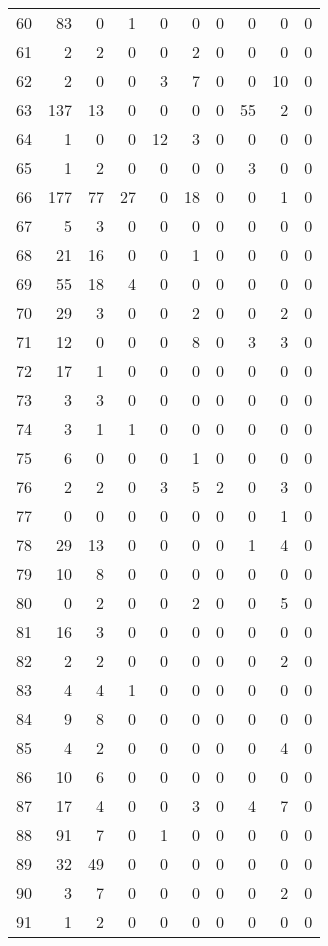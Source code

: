 \begin{tabular}{lrrrrrrrrr}
60 & 83 & 0 & 1 & 0 & 0 & 0 & 0 & 0 & 0 \\
61 & 2 & 2 & 0 & 0 & 2 & 0 & 0 & 0 & 0 \\
62 & 2 & 0 & 0 & 3 & 7 & 0 & 0 & 10 & 0 \\
63 & 137 & 13 & 0 & 0 & 0 & 0 & 55 & 2 & 0 \\
64 & 1 & 0 & 0 & 12 & 3 & 0 & 0 & 0 & 0 \\
65 & 1 & 2 & 0 & 0 & 0 & 0 & 3 & 0 & 0 \\
66 & 177 & 77 & 27 & 0 & 18 & 0 & 0 & 1 & 0 \\
67 & 5 & 3 & 0 & 0 & 0 & 0 & 0 & 0 & 0 \\
68 & 21 & 16 & 0 & 0 & 1 & 0 & 0 & 0 & 0 \\
69 & 55 & 18 & 4 & 0 & 0 & 0 & 0 & 0 & 0 \\
70 & 29 & 3 & 0 & 0 & 2 & 0 & 0 & 2 & 0 \\
71 & 12 & 0 & 0 & 0 & 8 & 0 & 3 & 3 & 0 \\
72 & 17 & 1 & 0 & 0 & 0 & 0 & 0 & 0 & 0 \\
73 & 3 & 3 & 0 & 0 & 0 & 0 & 0 & 0 & 0 \\
74 & 3 & 1 & 1 & 0 & 0 & 0 & 0 & 0 & 0 \\
75 & 6 & 0 & 0 & 0 & 1 & 0 & 0 & 0 & 0 \\
76 & 2 & 2 & 0 & 3 & 5 & 2 & 0 & 3 & 0 \\
77 & 0 & 0 & 0 & 0 & 0 & 0 & 0 & 1 & 0 \\
78 & 29 & 13 & 0 & 0 & 0 & 0 & 1 & 4 & 0 \\
79 & 10 & 8 & 0 & 0 & 0 & 0 & 0 & 0 & 0 \\
80 & 0 & 2 & 0 & 0 & 2 & 0 & 0 & 5 & 0 \\
81 & 16 & 3 & 0 & 0 & 0 & 0 & 0 & 0 & 0 \\
82 & 2 & 2 & 0 & 0 & 0 & 0 & 0 & 2 & 0 \\
83 & 4 & 4 & 1 & 0 & 0 & 0 & 0 & 0 & 0 \\
84 & 9 & 8 & 0 & 0 & 0 & 0 & 0 & 0 & 0 \\
85 & 4 & 2 & 0 & 0 & 0 & 0 & 0 & 4 & 0 \\
86 & 10 & 6 & 0 & 0 & 0 & 0 & 0 & 0 & 0 \\
87 & 17 & 4 & 0 & 0 & 3 & 0 & 4 & 7 & 0 \\
88 & 91 & 7 & 0 & 1 & 0 & 0 & 0 & 0 & 0 \\
89 & 32 & 49 & 0 & 0 & 0 & 0 & 0 & 0 & 0 \\
90 & 3 & 7 & 0 & 0 & 0 & 0 & 0 & 2 & 0 \\
91 & 1 & 2 & 0 & 0 & 0 & 0 & 0 & 0 & 0 \\

\end{tabular}
